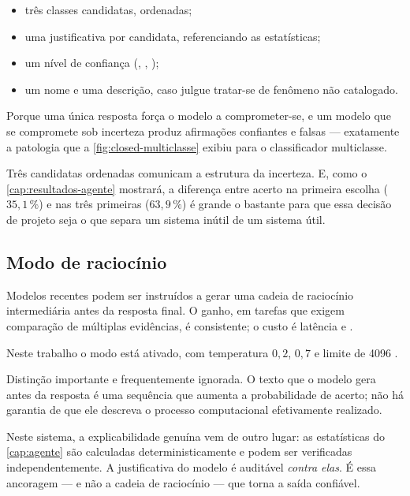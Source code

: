 \begin{itemize}[leftmargin=*,itemsep=0.2em]
  \item três classes candidatas, ordenadas;
  \item uma justificativa por candidata, referenciando as estatísticas;
  \item um nível de confiança (, , );
  \item um nome e uma descrição, caso julgue tratar-se de fenômeno não catalogado.
\end{itemize}

\begin{destaque}
Porque uma única resposta força o modelo a comprometer-se, e um modelo que se compromete
sob incerteza produz afirmações confiantes e falsas --- exatamente a patologia que a
\cref{fig:closed-multiclasse} exibiu para o classificador multiclasse.

Três candidatas ordenadas comunicam a estrutura da incerteza. E, como o
\cref{cap:resultados-agente} mostrará, a diferença entre acerto na primeira escolha
($35{,}1\,\%$) e nas três primeiras ($63{,}9\,\%$) é grande o bastante para que essa
decisão de projeto seja o que separa um sistema inútil de um sistema útil.
\end{destaque}

\subsection{Modo de raciocínio}

Modelos recentes podem ser instruídos a gerar uma cadeia de raciocínio intermediária
antes da resposta final. O ganho, em tarefas que exigem comparação de múltiplas
evidências, é consistente; o custo é latência e .

Neste trabalho o modo está ativado, com temperatura $0{,}2$,  $0{,}7$ e limite
de \num{4096} .

\begin{destaque}
Distinção importante e frequentemente ignorada. O texto que o modelo gera antes da
resposta é uma sequência que aumenta a probabilidade de acerto; não há garantia de que
ele descreva o processo computacional efetivamente realizado.

Neste sistema, a explicabilidade genuína vem de outro lugar: as estatísticas do
\cref{cap:agente} são calculadas deterministicamente e podem ser verificadas
independentemente. A justificativa do modelo é auditável \emph{contra elas}. É essa
ancoragem --- e não a cadeia de raciocínio --- que torna a saída confiável.
\end{destaque}

